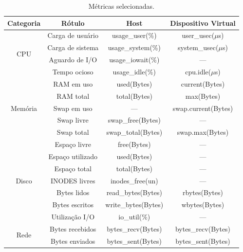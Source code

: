 \begin{table}[H]
\color{red}
\centering
\caption{Métricas selecionadas.}
\label{tab:metricas-selecionadas}
\begin{adjustbox}{max width=\textwidth}
\begin{tabular}{|c|c|c|c|}
\hline
\textbf{Categoria} & \textbf{Rótulo} & \textbf{Host} & \textbf{Dispositivo Virtual} \\ \hline
\multirow{4}{*}{CPU} & Carga de usuário & usage\_user(\%) & user\_usec($\mu$s) \\ \cline{2-4}
                     & Carga de sistema & usage\_system(\%) & system\_usec($\mu$s) \\ \cline{2-4}
                     & Aguardo de I/O & usage\_iowait(\%) & --- \\ \cline{2-4}
                     & Tempo ocioso & usage\_idle(\%) & cpu.idle($\mu$s) \\ \hline
\multirow{5}{*}{Memória} & RAM em uso & used(Bytes) & current(Bytes) \\ \cline{2-4}
                         & RAM total & total(Bytes) & max(Bytes) \\ \cline{2-4}
                         & Swap em uso & --- & swap.current(Bytes) \\ \cline{2-4}
                         & Swap livre & swap\_free(Bytes) & ---  \\ \cline{2-4}
                         & Swap total & swap\_total(Bytes) & swap.max(Bytes) \\ \hline
\multirow{7}{*}{Disco} & Espaço livre & free(Bytes)         & ---     \\ \cline{2-4}
                       & Espaço utilizado & used(Bytes)         & ---     \\ \cline{2-4}
                       & Espaço total & total(Bytes)        & ---     \\ \cline{2-4}
                       & INODES livres & inodes\_free(un) & ---     \\ \cline{2-4}
                       & Bytes lidos & read\_bytes(Bytes)  & rbytes(Bytes) \\ \cline{2-4}
                       & Bytes escritos & write\_bytes(Bytes) & wbytes(Bytes) \\ \cline{2-4}
                       & Utilização I/O & io\_util(\%)     & ---     \\ \hline
\multirow{8}{*}{Rede} & Bytes recebidos & bytes\_recv(Bytes)     & bytes\_recv(Bytes) \\ \cline{2-4}
                      & Bytes enviados & bytes\_sent(Bytes)     & bytes\_sent(Bytes) \\ \cline{2-4}

\end{tabular}
\end{adjustbox}
\end{table}
